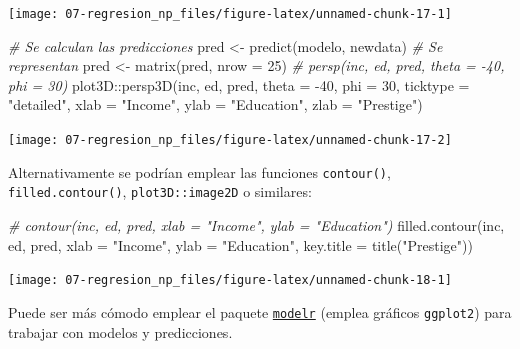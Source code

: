 \documentclass[
  spanish,
]{book}
\newenvironment{Shaded}{\begin{snugshade}}{\end{snugshade}}
\newcommand{\AttributeTok}[1]{\textcolor[rgb]{0.77,0.63,0.00}{#1}}
\newcommand{\CommentTok}[1]{\textcolor[rgb]{0.56,0.35,0.01}{\textit{#1}}}
\newcommand{\DecValTok}[1]{\textcolor[rgb]{0.00,0.00,0.81}{#1}}
\newcommand{\FunctionTok}[1]{\textcolor[rgb]{0.00,0.00,0.00}{#1}}
\newcommand{\NormalTok}[1]{#1}
\newcommand{\OtherTok}[1]{\textcolor[rgb]{0.56,0.35,0.01}{#1}}
\newcommand{\SpecialCharTok}[1]{\textcolor[rgb]{0.00,0.00,0.00}{#1}}
\newcommand{\StringTok}[1]{\textcolor[rgb]{0.31,0.60,0.02}{#1}}
\theoremstyle{break}
\theoremstyle{definition}
\theoremstyle{definition}
\theoremstyle{definition}
\theoremstyle{definition}
\theoremstyle{remark}
\begin{document}
\begin{center}\texttt{[image: 07-regresion\_np\_files/figure-latex/unnamed-chunk-17-1]} \end{center}

\begin{Shaded}
\begin{Highlighting}[]
\CommentTok{\# Se calculan las predicciones}
\NormalTok{pred }\OtherTok{\textless{}{-}} \FunctionTok{predict}\NormalTok{(modelo, newdata)}
\CommentTok{\# Se representan}
\NormalTok{pred }\OtherTok{\textless{}{-}} \FunctionTok{matrix}\NormalTok{(pred, }\AttributeTok{nrow =} \DecValTok{25}\NormalTok{)}
\CommentTok{\# persp(inc, ed, pred, theta = {-}40, phi = 30)}
\NormalTok{plot3D}\SpecialCharTok{::}\FunctionTok{persp3D}\NormalTok{(inc, ed, pred, }\AttributeTok{theta =} \SpecialCharTok{{-}}\DecValTok{40}\NormalTok{, }\AttributeTok{phi =} \DecValTok{30}\NormalTok{, }\AttributeTok{ticktype =} \StringTok{"detailed"}\NormalTok{,}
                \AttributeTok{xlab =} \StringTok{"Income"}\NormalTok{, }\AttributeTok{ylab =} \StringTok{"Education"}\NormalTok{, }\AttributeTok{zlab =} \StringTok{"Prestige"}\NormalTok{)}
\end{Highlighting}
\end{Shaded}

\begin{center}\texttt{[image: 07-regresion\_np\_files/figure-latex/unnamed-chunk-17-2]} \end{center}

Alternativamente se podrían emplear las funciones \texttt{contour()}, \texttt{filled.contour()}, \texttt{plot3D::image2D} o similares:

\begin{Shaded}
\begin{Highlighting}[]
\CommentTok{\# contour(inc, ed, pred, xlab = "Income", ylab = "Education")}
\FunctionTok{filled.contour}\NormalTok{(inc, ed, pred, }\AttributeTok{xlab =} \StringTok{"Income"}\NormalTok{, }\AttributeTok{ylab =} \StringTok{"Education"}\NormalTok{, }\AttributeTok{key.title =} \FunctionTok{title}\NormalTok{(}\StringTok{"Prestige"}\NormalTok{))}
\end{Highlighting}
\end{Shaded}

\begin{center}\texttt{[image: 07-regresion\_np\_files/figure-latex/unnamed-chunk-18-1]} \end{center}

Puede ser más cómodo emplear el paquete \href{https://modelr.tidyverse.org}{\texttt{modelr}} (emplea gráficos \texttt{ggplot2}) para trabajar con modelos y predicciones.
\end{document}
